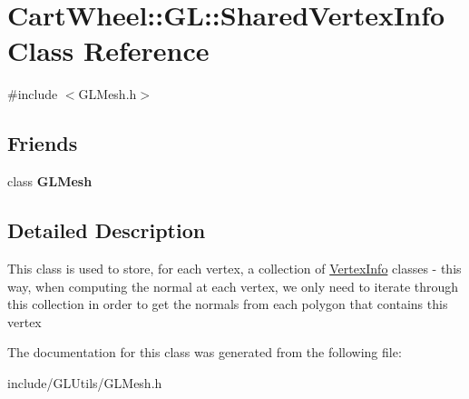 \hypertarget{classCartWheel_1_1GL_1_1SharedVertexInfo}{
\section{CartWheel::GL::SharedVertexInfo Class Reference}
\label{classCartWheel_1_1GL_1_1SharedVertexInfo}
}


{\ttfamily \#include $<$GLMesh.h$>$}

\subsection*{Friends}
\begin{DoxyCompactItemize}
\item 
\hypertarget{classCartWheel_1_1GL_1_1SharedVertexInfo_a7ad5c94227dd02947e02998b7eaaf5d9}{
class {\bfseries GLMesh}}
\label{classCartWheel_1_1GL_1_1SharedVertexInfo_a7ad5c94227dd02947e02998b7eaaf5d9}

\end{DoxyCompactItemize}


\subsection{Detailed Description}
This class is used to store, for each vertex, a collection of \hyperlink{classCartWheel_1_1GL_1_1VertexInfo}{VertexInfo} classes -\/ this way, when computing the normal at each vertex, we only need to iterate through this collection in order to get the normals from each polygon that contains this vertex 

The documentation for this class was generated from the following file:\begin{DoxyCompactItemize}
\item 
include/GLUtils/GLMesh.h\end{DoxyCompactItemize}
